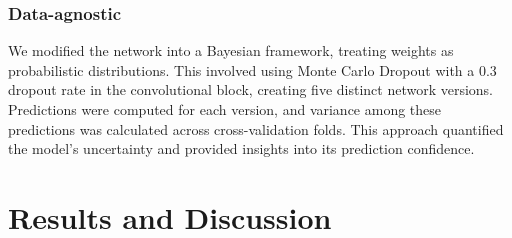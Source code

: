 \documentclass{article}
\begin{document}
\subsubsection{Data-agnostic}
We modified the network into a Bayesian framework, treating weights as probabilistic distributions. This involved using Monte Carlo Dropout \cite{R13} with a 0.3 dropout rate in the convolutional block, creating five distinct network versions. Predictions were computed for each version, and variance among these predictions was calculated across cross-validation folds. This approach quantified the model's uncertainty and provided insights into its prediction confidence.

\section{Results and Discussion}
\label{sssec:results}
\end{document}
